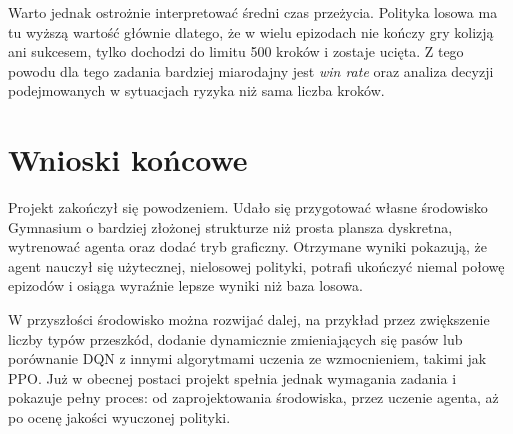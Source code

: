 \documentclass[12pt,a4paper]{article}
\begin{document}
Warto jednak ostrożnie interpretować średni czas przeżycia. Polityka losowa ma tu wyższą wartość głównie dlatego, że w wielu epizodach nie kończy gry kolizją ani sukcesem, tylko dochodzi do limitu 500 kroków i zostaje ucięta. Z tego powodu dla tego zadania bardziej miarodajny jest \textit{win rate} oraz analiza decyzji podejmowanych w sytuacjach ryzyka niż sama liczba kroków.

\section{Wnioski końcowe}
Projekt zakończył się powodzeniem. Udało się przygotować własne środowisko Gymnasium o bardziej złożonej strukturze niż prosta plansza dyskretna, wytrenować agenta oraz dodać tryb graficzny. Otrzymane wyniki pokazują, że agent nauczył się użytecznej, nielosowej polityki, potrafi ukończyć niemal połowę epizodów i osiąga wyraźnie lepsze wyniki niż baza losowa.

W przyszłości środowisko można rozwijać dalej, na przykład przez zwiększenie liczby typów przeszkód, dodanie dynamicznie zmieniających się pasów lub porównanie DQN z innymi algorytmami uczenia ze wzmocnieniem, takimi jak PPO. Już w obecnej postaci projekt spełnia jednak wymagania zadania i pokazuje pełny proces: od zaprojektowania środowiska, przez uczenie agenta, aż po ocenę jakości wyuczonej polityki.
\end{document}
